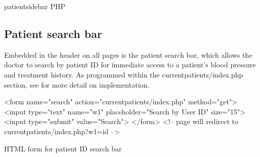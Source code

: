 \documentclass[11pt]{article}
\begin{document}
\begin{code}[ht]
\caption{patientsidebar PHP}
\label{code:PHPsidebar}
\end{code}


\subsection{Patient search bar}

Embedded in the header on all pages is the patient search bar, which allows the doctor to search by patient ID for immediate access to a patient's blood pressure and treatment history. As programmed within the currentpatients/index.php section, see for more detail on implementation. 



\begin{code}[ht]
\begin{html}
<form name="search" action="currentpatients/index.php" method="get">
<input type="text" name="w1" placeholder="Search by User ID" size="15">
<input type="submit" value="Search">
</form>
<!-- page will redirect to currentpatients/index.php?w1=id -->
\end{html}
\caption{HTML form for patient ID search bar}
\label{code:searchBar}
\end{code}
\end{document}
